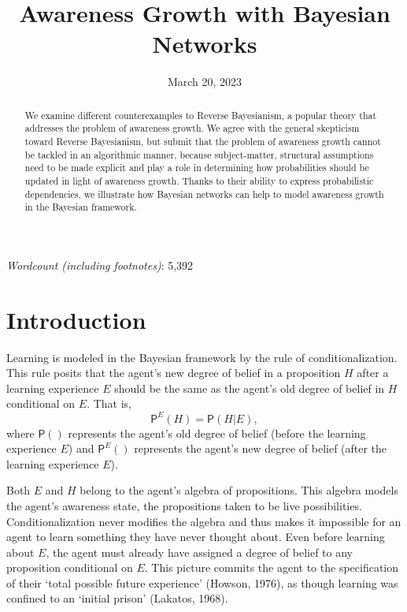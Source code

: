 \documentclass[
  11pt,
  dvipsnames,enabledeprecatedfontcommands]{scrartcl}
\title{Awareness Growth with Bayesian Networks}
\author{}
\date{\vspace{-2.5em}March 20, 2023}
\newcommand{\pr}[1]{\ensuremath{\mathsf{P}(#1)}}
\newcommand{\ppr}[2]{\ensuremath{\mathsf{P}^{#1}(#2)}}
\begin{document}
\maketitle

\doublespace

\emph{Wordcount (including footnotes)}: 5,392

\begin{abstract}
We examine different counterexamples to Reverse Bayesianism, a popular theory 
that addresses the problem of awareness growth. We agree with the general skepticism toward Reverse Bayesianism, but submit that the problem of awareness growth cannot be tackled in an algorithmic manner, because subject-matter, structural assumptions need to be made explicit and play a role in determining how probabilities should be updated in light of awareness growth. Thanks to their ability to express probabilistic dependencies, we illustrate how Bayesian networks can help to model awareness growth in the Bayesian framework. 
\end{abstract}

\doublespace
\linenumbers

\hypertarget{introduction}{%
\section{Introduction}\label{introduction}}

Learning is modeled in the Bayesian framework by the rule of
conditionalization. This rule posits that the agent's new degree of
belief in a proposition \(H\) after a learning experience \(E\) should
be the same as the agent's old degree of belief in \(H\) conditional on
\(E\). That is, \[\ppr{E}{H}=\pr{H \vert E},\] where \(\pr{}\)
represents the agent's old degree of belief (before the learning
experience \(E\)) and \(\ppr{E}{}\) represents the agent's new degree of
belief (after the learning experience \(E\)).

Both \(E\) and \(H\) belong to the agent's algebra of propositions. This
algebra models the agent's awareness state, the propositions taken to be
live possibilities. Conditionalization never modifies the algebra and
thus makes it impossible for an agent to learn something they have never
thought about. Even before learning about \(E\), the agent must already
have assigned a degree of belief to any proposition conditional on
\(E\). This picture commits the agent to the specification of their
`total possible future experience' (Howson, 1976), as though learning
was confined to an `initial prison' (Lakatos, 1968).
\end{document}
